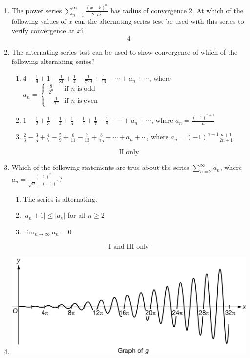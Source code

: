 \documentclass[12pt]{article}
\begin{document}
\begin{enumerate}
	\item The power series $\sum_{n=1}^{\infty} \frac{(x-5)^n}{2^nn^2}$ has radius of convergence $2$. At which of the following values of $x$ can the alternating series test be used with this series to verify convergence at $x$?
	$$\boxed{4}$$
	\item The alternating series test can be used to show convergence of which of the following alternating series?
	      \begin{enumerate}[label=\Roman*.]
	      	\item $4-\frac{1}{9} + 1 - \frac{1}{81}+ \frac{1}{4} - \frac{1}{729} + \frac{1}{16} - \cdots + a_n +\cdots$, where $a_n = \left\{ \begin{matrix}
	      	      \frac{8}{2^n} & \text{if } n \text{ is odd} \\
	      	      -\frac{1}{3^n} & \text{if } n \text{ is even}
	      	\end{matrix}\right.\, $
	      	\item $1-\frac{1}{2}+\frac{1}{3}-\frac{1}{4}+\frac{1}{5} -\frac{1}{6} +\frac{1}{7} -\frac{1}{8} + \cdots + a_n + \cdots$, where $a_n = \frac{(-1)^{n+1}}{n}$
	      	\item $\frac{2}{3} - \frac{3}{5} + \frac{4}{7} - \frac{5}{9} +\frac{6}{11} - \frac{7}{13} +\frac{8}{15}-\cdots + a_n +\cdots$, where $a_n = (-1)^{n+1} \frac{n+1}{2n+1}$
	      \end{enumerate}
		  $$\boxed{\text{II only}}$$
    \item Which of the following statements are true about the series $\sum_{n=2}^{\infty}a_n$, where $a_n =\frac{(-1)^n}{\sqrt{n}+ (-1)^n}$?
    \begin{enumerate}[label=\Roman*.]
        \item The series is alternating.
        \item $|a_n+1|\leq |a_n|$ for all $n\geq 2$
        \item $\lim_{n\to\infty}a_n = 0$
    \end{enumerate}
	$$\boxed{\text{I and III only}}$$
    \item 
    \begin{center}
        \includegraphics*[width = 5in]{8.076.png}

\end{center}
\end{enumerate}
\end{document}

